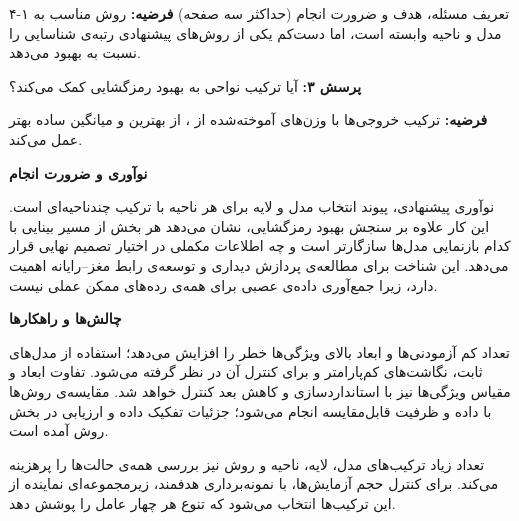 \documentclass{ut-proposal}
\newcommand{\ProposalSubheading}[1]{\textcolor{UTBlue}{\textbf{#1}}}
\begin{document}
\begin{UTProposalSection}{۴-۱ تعریف مسئله، هدف و ضرورت انجام (حداکثر سه صفحه)}
		\textbf{فرضیه:} روش مناسب به مدل و ناحیه وابسته است، اما دست‌کم یکی از روش‌های پیشنهادی رتبه‌ی شناسایی را نسبت به  بهبود می‌دهد.

		\textbf{پرسش ۳:} آیا ترکیب نواحی به بهبود رمزگشایی کمک می‌کند؟ 
		
		\textbf{فرضیه:} ترکیب خروجی‌ها با وزن‌های آموخته‌شده از ، از بهترین  و میانگین ساده بهتر عمل می‌کند.

		\ProposalSubheading{نوآوری و ضرورت انجام}

		نوآوری پیشنهادی، پیوند انتخاب مدل و لایه برای هر ناحیه با ترکیب چندناحیه‌ای است. این کار علاوه بر سنجش بهبود رمزگشایی، نشان می‌دهد هر بخش از مسیر بینایی با کدام بازنمایی مدل‌ها سازگارتر است و چه اطلاعات مکملی در اختیار تصمیم نهایی قرار می‌دهد. این شناخت برای مطالعه‌ی پردازش دیداری و توسعه‌ی رابط مغز–رایانه اهمیت دارد، زیرا جمع‌آوری داده‌ی عصبی برای همه‌ی رده‌های ممکن عملی نیست.

		\ProposalSubheading{چالش‌ها و راهکارها}

		تعداد کم آزمودنی‌ها و ابعاد بالای ویژگی‌ها خطر  را افزایش می‌دهد؛ استفاده از مدل‌های ثابت، نگاشت‌های کم‌پارامتر و  برای کنترل آن در نظر گرفته می‌شود. تفاوت ابعاد و مقیاس ویژگی‌ها نیز با استانداردسازی و کاهش بعد کنترل خواهد شد. مقایسه‌ی روش‌ها با داده و ظرفیت قابل‌مقایسه انجام می‌شود؛ جزئیات تفکیک داده و ارزیابی در بخش روش آمده است.

		تعداد زیاد ترکیب‌های مدل، لایه، ناحیه و روش  نیز بررسی همه‌ی حالت‌ها را پرهزینه می‌کند. برای کنترل حجم آزمایش‌ها، با نمونه‌برداری هدفمند، زیرمجموعه‌ای نماینده از این ترکیب‌ها انتخاب می‌شود که تنوع هر چهار عامل را پوشش دهد.
	\end{UTProposalSection}
\end{document}
